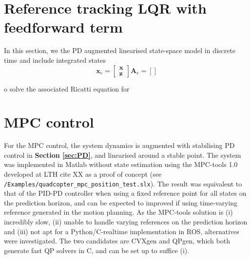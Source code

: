 \documentclass{article}
\begin{document}
\section{Reference tracking LQR with feedforward term}
In this section, we the PD augmented linearised state-space model in discrete time and include integrated states
\begin{equation}
\mathbf{x}_{e} = \begin{bmatrix}\mathbf{x}\\\mathbf{z}\end{bmatrix}
\mathbf{A}_{e} = []
\end{equation}

o solve the associated Ricatti equation for 
\section{MPC control}
For the MPC control, the system dynamics is augmented with stabilising PD control in \textbf{Section \ref{sec:PD}}, and linearised around a stable point. The system was implemented in Matlab without state estimation using the MPC-tools 1.0 developed at LTH cite XX as a proof of concept (see \texttt{/Examples/quadcopter\_mpc\_position\_test.slx}). The result was equivalent to that of the PID-PD controller when using a fixed reference point for all states on the prediction horizon, and can be expected to improved if using time-varying reference generated in the motion planning. As the MPC-tools solution is (i) incredibly slow, (ii) unable to handle varying references on the prediction horizon and (iii) not apt for a Python/C-realtime implementation in ROS, alternatives were investigated. The two candidates are CVXgen and QPgen, which both generate fast QP solvers in C, and can be set up to suffice (i).
\end{document}
